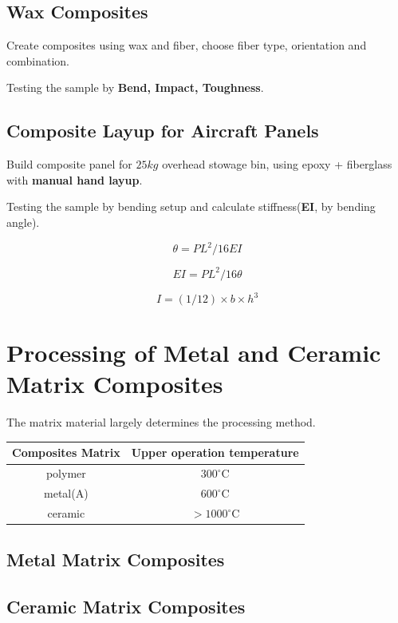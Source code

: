 \documentclass{NoteThesis/note-thesis}
\begin{document}
\subsection{Wax Composites}

Create composites using wax and fiber, choose fiber type, orientation and combination.

Testing the sample by \textbf{Bend, Impact, Toughness}.

\subsection{Composite Layup for Aircraft Panels}

Build composite panel for $25kg$ overhead stowage bin, using epoxy + fiberglass with \textbf{manual hand layup}.

Testing the sample by bending setup and calculate stiffness(\textbf{EI}, by bending angle).

$$
\theta = PL^2/16EI
$$

$$
EI = PL^2/16\theta
$$

$$
I=(1/12)\times b \times h^3
$$

\section{Processing of Metal and Ceramic Matrix Composites}

The matrix material largely determines the processing method.

\begin{table}[h]
    \centering
    \begin{tabular}{c|c}
        \hline
        Composites Matrix & Upper operation temperature\\
        \hline
        polymer & $300^\circ \text{C}$\\
        metal(A) & $600^\circ \text{C}$\\
        ceramic & $>1000^\circ \text{C}$\\
        \hline
    \end{tabular}
\end{table}

\subsection{Metal Matrix Composites}


\subsection{Ceramic Matrix Composites}
\end{document}
